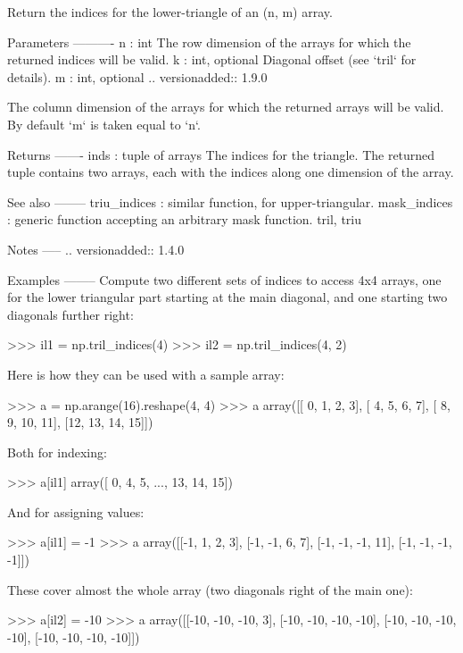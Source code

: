 \begin{DoxyVerb}Return the indices for the lower-triangle of an (n, m) array.

Parameters
----------
n : int
    The row dimension of the arrays for which the returned
    indices will be valid.
k : int, optional
    Diagonal offset (see `tril` for details).
m : int, optional
    .. versionadded:: 1.9.0

    The column dimension of the arrays for which the returned
    arrays will be valid.
    By default `m` is taken equal to `n`.


Returns
-------
inds : tuple of arrays
    The indices for the triangle. The returned tuple contains two arrays,
    each with the indices along one dimension of the array.

See also
--------
triu_indices : similar function, for upper-triangular.
mask_indices : generic function accepting an arbitrary mask function.
tril, triu

Notes
-----
.. versionadded:: 1.4.0

Examples
--------
Compute two different sets of indices to access 4x4 arrays, one for the
lower triangular part starting at the main diagonal, and one starting two
diagonals further right:

>>> il1 = np.tril_indices(4)
>>> il2 = np.tril_indices(4, 2)

Here is how they can be used with a sample array:

>>> a = np.arange(16).reshape(4, 4)
>>> a
array([[ 0,  1,  2,  3],
       [ 4,  5,  6,  7],
       [ 8,  9, 10, 11],
       [12, 13, 14, 15]])

Both for indexing:

>>> a[il1]
array([ 0,  4,  5, ..., 13, 14, 15])

And for assigning values:

>>> a[il1] = -1
>>> a
array([[-1,  1,  2,  3],
       [-1, -1,  6,  7],
       [-1, -1, -1, 11],
       [-1, -1, -1, -1]])

These cover almost the whole array (two diagonals right of the main one):

>>> a[il2] = -10
>>> a
array([[-10, -10, -10,   3],
       [-10, -10, -10, -10],
       [-10, -10, -10, -10],
       [-10, -10, -10, -10]])\end{DoxyVerb}
 \mbox{\label{namespacenumpy_1_1lib_1_1twodim__base_acf3be40e3614389bdaded615b72aa5e0}} 
